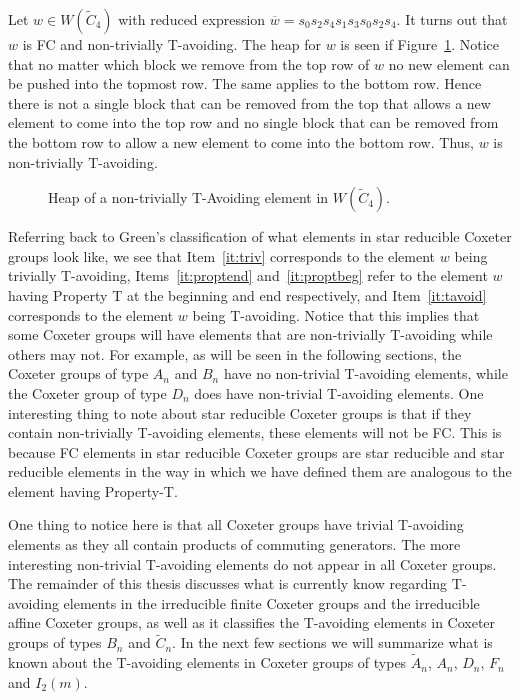 \begin{example}
Let $w \in W(\widetilde{C}_4)$ with reduced expression $\overline{w}=s_0s_2s_4s_1s_3s_0s_2s_4$. It turns out that $w$ is FC and non-trivially T-avoiding. The heap for $w$ is seen if Figure~\ref{fig:sandwich1}. Notice that no matter which block we remove from the top row of $w$ no new element can be pushed into the topmost row. The same applies to the bottom row. Hence there is not a single block that can be removed from the top that allows a new element to come into the top row and no single block that can be removed from the bottom row to allow a new element to come into the bottom row. Thus, $w$ is non-trivially T-avoiding. 
\begin{figure}[h!]
\centering
{}
\caption{Heap of a non-trivially T-Avoiding element in $W(\widetilde{C}_4)$.}\label{fig:sandwich1}	
\end{figure}
\end{example}

Referring back to Green's classification of what elements in star reducible Coxeter groups look like, we see that Item~\ref{it:triv} corresponds to the element $w$ being trivially T-avoiding, Items~\ref{it:proptend} and~\ref{it:proptbeg} refer to the element $w$ having Property T at the beginning and end respectively, and Item~\ref{it:tavoid} corresponds to the element $w$ being T-avoiding. Notice that this implies that some Coxeter groups will have elements that are non-trivially T-avoiding while others may not. For example, as will be seen in the following sections, the Coxeter groups of type $A_n$ and $B_n$ have no non-trivial T-avoiding elements, while the Coxeter group of type $D_n$ does have non-trivial T-avoiding elements. One interesting thing to note about star reducible Coxeter groups is that if they contain non-trivially T-avoiding elements, these elements will not be FC. This is because FC elements in star reducible Coxeter groups are star reducible and star reducible elements in the way in which we have defined them are analogous to the element having Property-T.

One thing to notice here is that all Coxeter groups have trivial T-avoiding elements as they all contain products of commuting generators. The more interesting non-trivial T-avoiding elements do not appear in all Coxeter groups. The remainder of this thesis discusses what is currently know regarding T-avoiding elements in the irreducible finite Coxeter groups and the irreducible affine Coxeter groups, as well as it classifies the T-avoiding elements in Coxeter groups of types $B_n$ and $\widetilde{C}_n$. In the next few sections we will summarize what is known about the T-avoiding elements in Coxeter groups of types $\widetilde{A}_n$, $A_n$, $D_n$, $F_n$ and $I_2(m)$.


